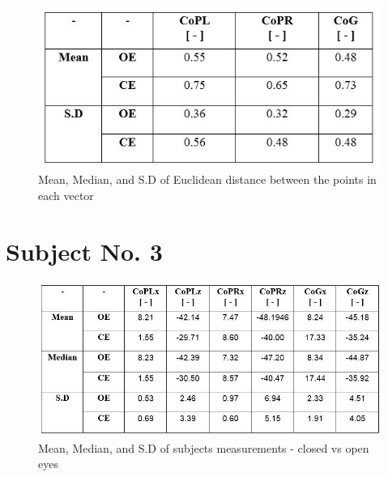 \documentclass[twoside]{ctuthesis}
\theoremstyle{plain}
\theoremstyle{definition}
\theoremstyle{note}
\begin{document}
\begin{figure}[H]
	\centering
	\includegraphics[width = .8\textwidth]{Patient1DistTable}
	\begin{table}[H]
		\caption{Mean, Median, and S.D of Euclidean distance between the points in each vector}
	\end{table}
\end{figure}

\section{Subject No. 3}

\begin{figure}[H]
	\centering
	\includegraphics[width = \textwidth]{Patient3DataTable}
	\begin{table}[H]
		\caption{Mean, Median, and S.D of subjects measurements - closed vs open eyes}
	\end{table}
\end{figure}
\end{document}
